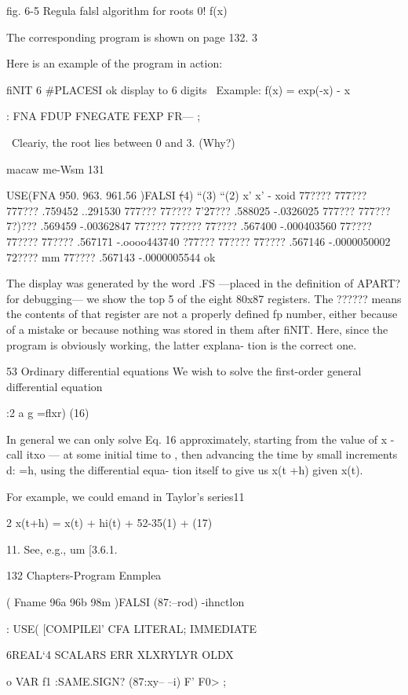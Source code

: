 {fig. 6-5 Regula falsl algorithm for roots 0! f(x)

The corresponding program is shown on page 132. 3

Here is an example of the program in action:

fiNIT 6 #PLACESI ok \set display to 6 digits
\ Example: f(x) = exp(-x) - x

: FNA FDUP FNEGATE FEXP FR— ;

\ Cleariy, the root lies between 0 and 3. (Why?)

macaw me-Wsm 131

USE(FNA 950. 963. 961.56 )FALSI
\st(4) “(3) “(2) x' x' - xoid
77???? 777??? 777??? .759452 ..291530
777??? 77???? 7'27??? .588025 -.0326025
777??? 777??? 7?)??? .569459 -.00362847
77???? 77???? 77???? .567400 -.000403560
77???? 77???? 77???? .567171 -.oooo443740
?77??? 77???? 77???? .567146 -.0000050002
72???? mm 77???? .567143 -.0000005544 ok

The display was generated by the word .FS —placed in the
definition of APART? for debugging— we show the top 5 of the
eight 80x87 registers. The ?????? means the contents of that
register are not a properly defined fp number, either because of
a mistake or because nothing was stored in them after fiNIT.
Here, since the program is obviously working, the latter explana-
tion is the correct one.

53 Ordinary differential equations
We wish to solve the first-order general differential equation

:2 a g =flxr) (16)

In general we can only solve Eq. 16 approximately, starting from
the value of x - call itxo — at some initial time to , then advancing
the time by small increments d: =h, using the differential equa-
tion itself to give us x(t +h) given x(t).

For example, we could emand in Taylor’s series11

2
x(t+h) = x(t) + hi(t) + 52-35(1) + (17)

 

11. See, e.g., um [3.6.1.

132 Chapters-Program Enmplea

\USE( Fname 96a 96b 98m )FALSI
(87:--rod)
\meeisthemmeoiaFORTl-ihnctlon

\iunctionnotation
: USE( [COMPILEl' CFA LITERAL;
IMMEDIATE

6REAL‘4 SCALARS ERR XLXRYLYR OLDX

o VAR f1 \apiacetostorecia
:SAME.SIGN? (87:xy-- --i)
F' F0> ;

}
